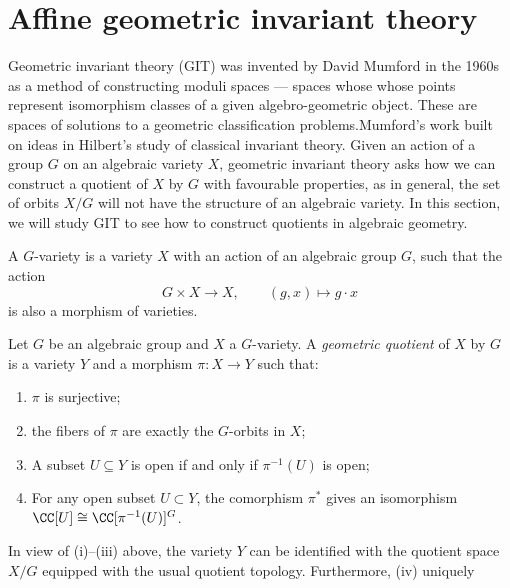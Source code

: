 \newpage
\section{Affine geometric invariant theory}
Geometric invariant theory (GIT) was invented by David Mumford in the 1960s as a method of constructing moduli spaces --- spaces whose whose points represent isomorphism classes of a given algebro-geometric object. These are spaces of solutions to a geometric classification problems.Mumford's work built on ideas in Hilbert's study of classical invariant theory. Given an action of a group $G$ on an algebraic variety $X$, geometric invariant theory asks how we can construct a quotient of $X$ by $G$ with favourable properties, as in general, the set of orbits $X/G$ will not have the structure of an algebraic variety. In this section, we will study GIT to see how to construct quotients in algebraic geometry.

\begin{definition}
    A $G$-variety is a variety $X$ with an action of an algebraic group $G$, such that the action
$$G \times X \to X, \qquad (g, x) \mapsto g \cdot x$$
    is also a morphism of varieties.
\end{definition}


\begin{definition}
    Let $G$ be an algebraic group and $X$ a $G$-variety. A \emph{geometric quotient} of $X$ by $G$ is a variety $Y$ and a morphism $\pi : X \to Y$ such that:
    \begin{enumerate}[label=(\roman*)]
        \item $\pi$ is surjective;
        \item the fibers of $\pi$ are exactly the $G$-orbits in $X$;
        \item A subset $U \subseteq Y$ is open if and only if $\pi^{-1}(U)$ is open;
        \item For any open subset $U \subset Y$, the comorphism $\pi^*$ gives an isomorphism $\CC[U] \cong \CC[\pi^{-1}(U)]^G$.
    \end{enumerate}
\end{definition}

In view of (i)--(iii) above, the variety $Y$ can be identified with the quotient space $X/G$ equipped with the usual quotient topology. Furthermore, (iv) uniquely  

